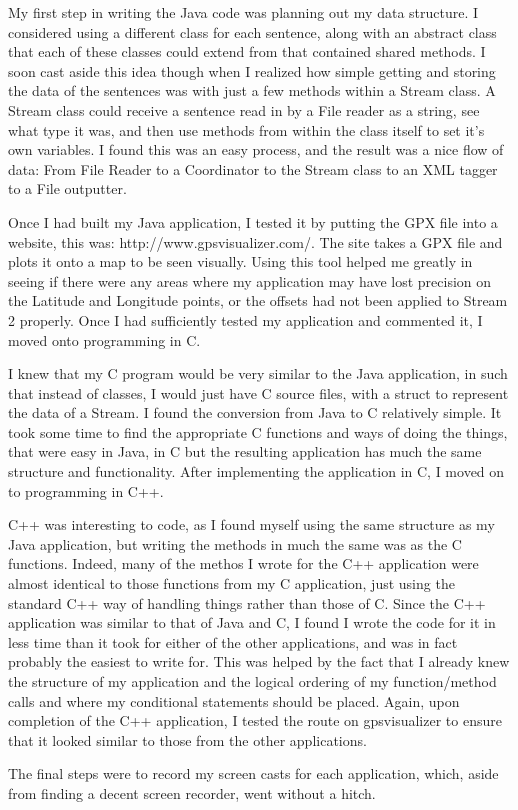 \documentclass{article}
\begin{document}
My first step in writing the Java code was planning out my data structure. I considered using a different class for each sentence, along with an abstract class that each of these classes could extend from that contained shared methods. I soon cast aside this idea though when I realized how simple getting and storing the data of the sentences was with just a few methods within a Stream class. A Stream class could receive a sentence read in by a File reader as a string, see what type it was, and then use methods from within the class itself to set it's own variables. I found this was an easy process, and the result was a nice flow of data: From File Reader to a Coordinator to the Stream class to  an XML tagger to a File outputter.

Once I had built my Java application, I tested it by putting the GPX file into a website, this was: http://www.gpsvisualizer.com/. The site takes a GPX file and plots it onto a map to be seen visually. Using this tool helped me greatly in seeing if there were any areas where my application may have lost precision on the Latitude and Longitude points, or the offsets had not been applied to Stream 2 properly. Once I had sufficiently tested my application and commented it, I moved onto programming in C.

I knew that my C program would be very similar to the Java application, in such that instead of classes, I would just have C source files, with a struct to represent the data of a Stream. I found the conversion from Java to C relatively simple. It took some time to find the appropriate C functions and ways of doing the things, that were easy in Java, in C but the resulting application has much the same structure and functionality. After implementing the application in C, I moved on to programming in C++.

C++ was interesting to code, as I found myself using the same structure as my Java application, but writing the methods in much the same was as the C functions. Indeed, many of the methos I wrote for the C++ application were almost identical to those functions from my C application, just using the standard C++ way of handling things rather than those of C. Since the C++ application was similar to that of Java and C, I found I wrote the code for it in less time than it took for either of the other applications, and was in fact probably the easiest to write for. This was helped by the fact that I already knew the structure of my application and the logical ordering of my function/method calls and where my conditional statements should be placed. Again, upon completion of the C++ application, I tested the route on gpsvisualizer to ensure that it looked similar to those from the other applications.

The final steps were to record my screen casts for each application, which, aside from finding a decent screen recorder, went without a hitch.
\end{document}
